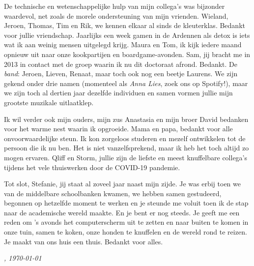 \documentclass[\home/main.tex]{subfiles}
\begin{document}
De technische en wetenschappelijke hulp van mijn collega's was bijzonder waardevol, net zoals de morele ondersteuning van mijn vrienden.
Wieland, Jeroen, Thomas, Tim en Rik, we kennen elkaar al sinds de kleuterklas. Bedankt voor jullie vriendschap. Jaarlijks een week gamen in de Ardennen als detox is iets wat ik aan weinig mensen uitgelegd krijg.
Maura en Tom, ik kijk iedere maand opnieuw uit naar onze kookpartijen en boardgame-avonden.
Sam, jij bracht me in 2013 in contact met de groep waarin ik nu dit doctoraat afrond. Bedankt.
De \textit{band}: Jeroen, Lieven, Renaat, maar toch ook nog een beetje Laurens. We zijn gekend onder drie namen (momenteel als \textit{Anna Lies}, zoek ons op Spotify!), maar we zijn toch al dertien jaar dezelfde individuen en samen vormen jullie mijn grootste muzikale uitlaatklep.
 
Ik wil verder ook mijn ouders, mijn zus Anastasia en mijn broer David bedanken voor het warme nest waarin ik opgroeide.
Mama en papa, bedankt voor alle onvoorwaardelijke steun. Ik kon zorgeloos studeren en mezelf ontwikkelen tot de persoon die ik nu ben. Het is niet vanzelfsprekend, maar ik heb het toch altijd zo mogen ervaren.
Qliff en Storm, jullie zijn de liefste en meest knuffelbare collega's tijdens het vele thuiswerken door de COVID-19 pandemie.
 
Tot slot, Stefanie, jij staat al zoveel jaar naast mijn zijde. Je was erbij toen we van de middelbare schoolbanken kwamen, we hebben samen gestudeerd, begonnen op hetzelfde moment te werken en je steunde me voluit toen ik de stap naar de academische wereld maakte. En je bent er nog steeds. Je geeft me een reden om 's avonds het computerscherm uit te zetten en naar buiten te komen in onze tuin, samen te koken, onze honden te knuffelen en de wereld rond te reizen. Je maakt van ons huis een thuis. Bedankt voor alles.


\vspace{1cm}

\begin{flushright}
    \textit{\theauthor, \today}
\end{flushright}
\end{document}
